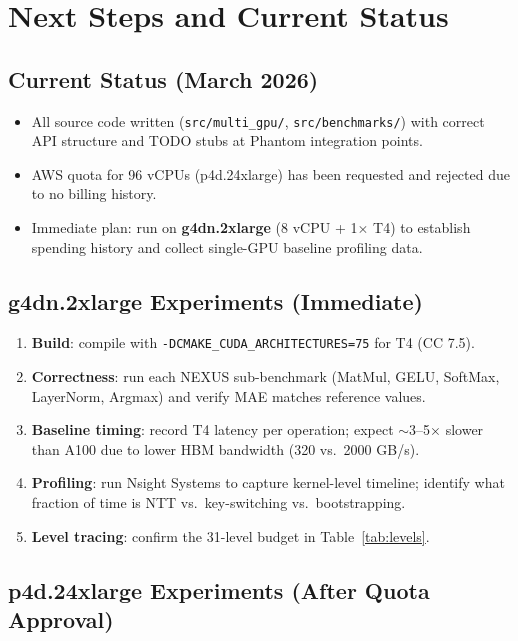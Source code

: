 \documentclass[11pt,letterpaper]{article}
\begin{document}
\section{Next Steps and Current Status}

\subsection{Current Status (March 2026)}

\begin{itemize}
  \item All source code written (\texttt{src/multi\_gpu/}, \texttt{src/benchmarks/}) with correct API structure and TODO stubs at Phantom integration points.
  \item AWS quota for 96 vCPUs (p4d.24xlarge) has been requested and rejected due to no billing history.
  \item Immediate plan: run on \textbf{g4dn.2xlarge} (8 vCPU + 1$\times$ T4) to establish spending history and collect single-GPU baseline profiling data.
\end{itemize}

\subsection{g4dn.2xlarge Experiments (Immediate)}

\begin{enumerate}
  \item \textbf{Build}: compile with \texttt{-DCMAKE\_CUDA\_ARCHITECTURES=75} for T4 (CC 7.5).
  \item \textbf{Correctness}: run each NEXUS sub-benchmark (MatMul, GELU, SoftMax, LayerNorm, Argmax) and verify MAE matches reference values.
  \item \textbf{Baseline timing}: record T4 latency per operation; expect $\sim$3--5$\times$ slower than A100 due to lower HBM bandwidth (320 vs.\ 2000 GB/s).
  \item \textbf{Profiling}: run Nsight Systems to capture kernel-level timeline; identify what fraction of time is NTT vs.\ key-switching vs.\ bootstrapping.
  \item \textbf{Level tracing}: confirm the 31-level budget in Table~\ref{tab:levels}.
\end{enumerate}

\subsection{p4d.24xlarge Experiments (After Quota Approval)}
\end{document}
